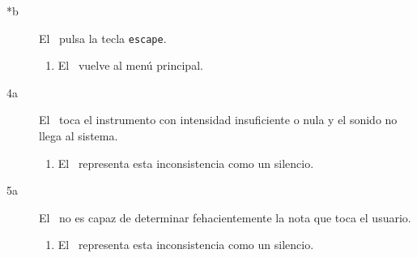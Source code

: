 \begin{description}
\begin{description}
  \item[*b] El \jugador\ pulsa la tecla \texttt{escape}.
    \begin{enumerate}
    \item El \sistema\ vuelve al menú principal.
    \end{enumerate}

  \item [4a] El \jugador\ toca el instrumento con intensidad insuficiente o nula
    y el sonido no llega al sistema.
    \begin{enumerate}
    \item El \sistema\ representa esta inconsistencia como un silencio.
    \end{enumerate}

  \item [5a] El \sistema\ no es capaz de determinar fehacientemente la nota que
    toca el usuario.
    \begin{enumerate}
    \item El \sistema\ representa esta inconsistencia como un silencio.
    \end{enumerate}
  \end{description}  
\end{description}

